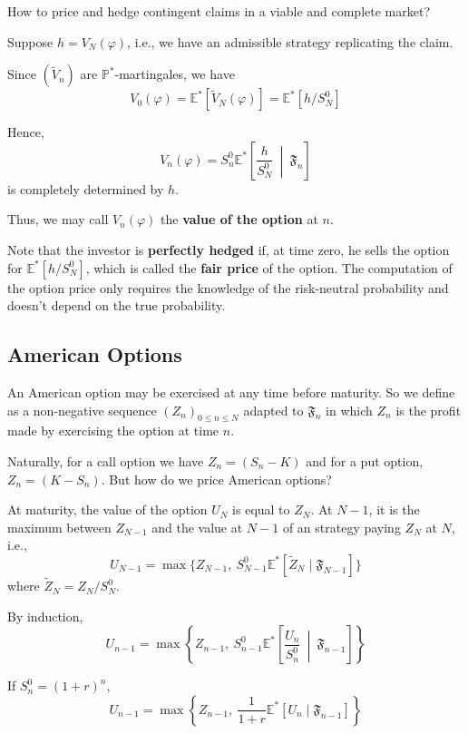 \begin{example}
    How to price and hedge contingent claims in a viable and complete market? 

    Suppose $h = V_N(\varphi)$, i.e., we have an admissible strategy replicating the claim. 

    Since $(\tilde{V}_n)$ are $\mathbb{P}^\ast$-martingales, we have 
    \[
        V_0(\varphi) = \mathbb{E}^\ast[\tilde{V}_N(\varphi)] = \mathbb{E}^\ast[h / S_N^0]
    \]

    Hence,
    \[
        V_n(\varphi) = S_n^0 \mathbb{E}^\ast \left[ \frac{h}{S_N^0} ~ \middle| ~ \mathfrak{F}_n \right]
    \]
    is completely determined by $h$.

    Thus, we may call $V_n(\varphi)$ the \textbf{value of the option} at $n$.

    Note that the investor is \textbf{perfectly hedged} if, at time zero, he sells the option for $\mathbb{E}^\ast[h / S_N^0]$, which is called the \textbf{fair price} of the option. The computation of the option price only requires the knowledge of the risk-neutral probability and doesn't depend on the true probability.
\end{example}

\subsection{American Options}

An American option may be exercised at any time before maturity. So we define as a non-negative sequence $(Z_n)_{0 \le n \le N}$ adapted to $\mathfrak{F}_n$ in which $Z_n$ is the profit made by exercising the option at time $n$. 

Naturally, for a call option we have $Z_n = (S_n - K)$ and for a put option, $Z_n = (K-S_n)$. But how do we price American options?

At maturity, the value of the option $U_N$ is equal to $Z_N$. At $N-1$, it is the maximum between $Z_{N-1}$ and the value at $N - 1$ of an strategy paying $Z_N$ at $N$, i.e.,
\[
    U_{N-1} = \max \{Z_{N-1}, ~S_{N-1}^0 \mathbb{E}^\ast[\tilde{Z}_N \mid \mathfrak{F}_{N-1}]\}
\]
where $\tilde{Z}_N = Z_N / S_N^0$.

By induction,
\[
    U_{n-1} = \max \left\{Z_{n-1}, ~S_{n-1}^0 \mathbb{E}^\ast \left[\frac{U_n}{S_n^0} ~ \middle| ~ \mathfrak{F}_{n-1} \right]\right\}
\]

If $S_n^0 = (1+r)^n$,
\[
    U_{n-1} = \max \left\{Z_{n-1}, ~\frac{1}{1+r} \mathbb{E}^\ast [U_n \mid \mathfrak{F}_{n-1} ] \right\}
\] 


